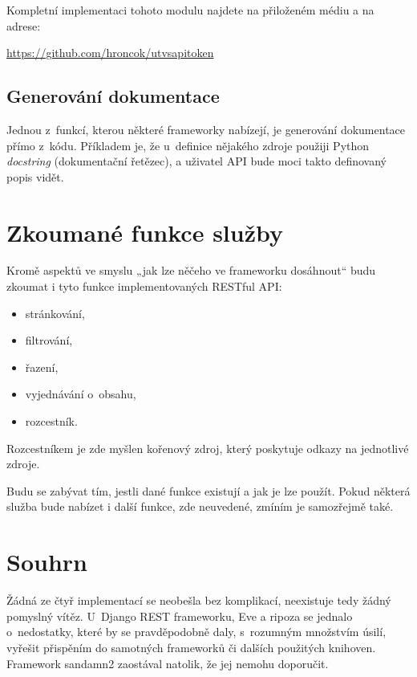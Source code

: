 Kompletní implementaci tohoto modulu najdete na přiloženém médiu a na adrese:

\url{https://github.com/hroncok/utvsapitoken}

\subsection{Generování dokumentace}\label{generovuxe1nuxed-dokumentace}

Jednou z~funkcí, kterou některé frameworky nabízejí, je generování dokumentace přímo z~kódu. Příkladem je, že u~definice nějakého zdroje použiji Python \emph{docstring} (dokumentační řetězec), a uživatel API bude moci takto definovaný popis vidět.

\section{Zkoumané funkce služby}\label{zkoumanuxe9-funkce-sluux17eby}

Kromě aspektů ve smyslu „jak lze něčeho ve frameworku dosáhnout“ budu zkoumat i tyto funkce implementovaných RESTful API:

\begin{itemize}
\tightlist
\item
  stránkování,
\item
  filtrování,
\item
  řazení,
\item
  vyjednávání o~obsahu,
\item
  rozcestník.
\end{itemize}

Rozcestníkem je zde myšlen kořenový zdroj, který poskytuje odkazy na jednotlivé zdroje.

Budu se zabývat tím, jestli dané funkce existují a jak je lze použít. Pokud některá služba bude nabízet i další funkce, zde neuvedené, zmíním je samozřejmě také.

   

\section{Souhrn}\label{souhrn}

Žádná ze čtyř implementací se neobešla bez komplikací, neexistuje tedy žádný pomyslný vítěz. U~Django REST frameworku, Eve a ripoza se jednalo o~nedostatky, které by se pravděpodobně daly, s~rozumným množstvím úsilí, vyřešit přispěním do samotných frameworků či dalších použitých knihoven. Framework sandamn2 zaostával natolik, že jej nemohu doporučit.
